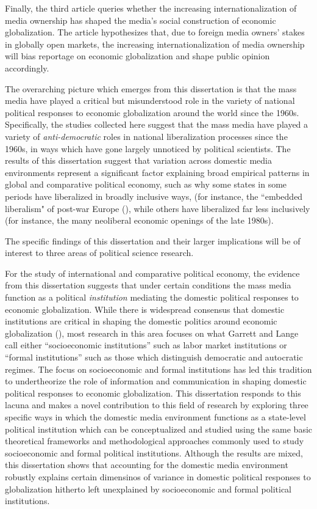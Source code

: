 \documentclass[12pt]{report}
\begin{document}
Finally, the third article queries whether the increasing internationalization of media ownership has shaped the media's social construction of economic globalization. The article hypothesizes that, due to foreign media owners' stakes in globally open markets, the increasing internationalization of media ownership will bias reportage on economic globalization and shape public opinion accordingly.

The overarching picture which emerges from this dissertation is that the mass media have played a critical but
misunderstood role in the variety of national political responses to economic globalization around
the world since the 1960s. Specifically, the studies collected here suggest that the mass media have
played a variety of \emph{anti-democratic} roles in national liberalization processes since the
1960s, in ways which have gone largely unnoticed by political scientists. The results of this
dissertation suggest that variation across domestic media environments represent a significant factor explaining broad
empirical patterns in global and comparative political economy, such as why some states in some
periods have liberalized in broadly inclusive ways, (for instance, the ``embedded liberalism" of
post-war Europe (\citealt{Ruggie:1982wx}), while others have liberalized far less inclusively (for
instance, the many neoliberal economic openings of the late 1980s).

The specific findings of this dissertation and their larger implications will be of interest to three areas of political science research.

For the study of international and comparative political economy, the evidence from this dissertation suggests that under certain conditions the mass media function as a political \emph{institution} mediating the domestic political responses to economic globalization. While there is widespread consensus that domestic institutions are critical in shaping the domestic politics around economic globalization (\citealt{Garrett:1995tf, Adsera:2002vt}), most research in this area focuses on what Garrett and Lange call either ``socioeconomic institutions'' such as labor market institutions or ``formal institutions'' such as those which distinguish democratic and autocratic regimes. The focus on socioeconomic and formal institutions has led this tradition to undertheorize the role of information and communication in shaping domestic political responses to economic globalization. This dissertation responds to this lacuna and makes a novel contribution to this field of research by exploring three specific ways in which the domestic media environment functions as a state-level political institution which can be conceptualized and studied using the same basic theoretical frameworks and methodological approaches commonly used to study socioeconomic and formal political institutions. Although the results are mixed, this dissertation shows that accounting for the domestic media environment robustly explains certain dimensinos of variance in domestic political responses to globalization hitherto left unexplained by socioeconomic and formal political institutions.
\end{document}
